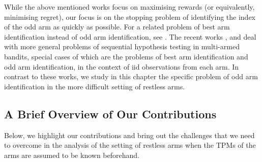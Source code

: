 While the above mentioned works focus on maximising rewards (or equivalently, minimising regret), our focus is on the stopping problem of identifying the index of the odd arm as quickly as possible. For a related problem of best arm identification instead of odd arm identification, see \cite{moulos2019optimal, Kaufmann2016}. The recent works  \cite{deshmukh2018controlled}, \cite{deshmukh2019sequential} and \cite{prabhu2020sequential} deal with more general problems of sequential hypothesis testing in multi-armed bandits, special cases of which are the problems of best arm identification and odd arm identification, in the context of iid observations from each arm. In contrast to these works, we study in this chapter the specific problem of odd arm identification in the more difficult setting of restless arms.

\subsection{A Brief Overview of Our Contributions}
Below, we highlight our contributions and bring out the challenges that we need to overcome in the analysis of the setting of restless arms when the TPMs of the arms are assumed to be known beforehand.
